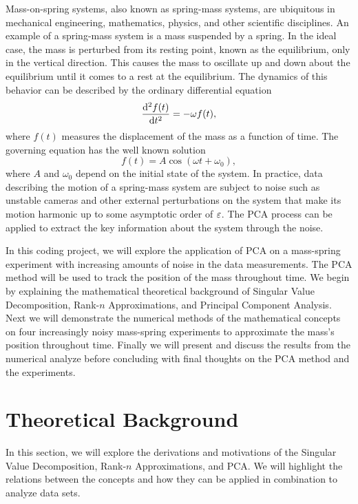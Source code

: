 \documentclass[12pt]{article}%
\begin{document}
Mass-on-spring systems, also known as spring-mass systems, are ubiquitous in mechanical engineering, mathematics, physics, and other scientific disciplines. An example of a spring-mass system is a mass suspended by a spring. In the ideal case, the mass is perturbed from its resting point, known as the equilibrium, only in the vertical direction. This causes the mass to oscillate up and down about the equilibrium until it comes to a rest at the equilibrium. The dynamics of this behavior can be described by the ordinary differential equation
\begin{equation} \label{oscillatory}
    \frac{\mathrm{d}^{2} f(t)}{\mathrm{d} t^{2}} = - \omega f(t),
\end{equation} 
where $f(t)$ measures the displacement of the mass as a function of time. The governing equation  has the well known solution
\begin{equation}
    f(t) = A \cos(\omega t + \omega_0),
\end{equation}
where $A$ and $\omega_0$ depend on the initial state of the system. In practice, data describing the motion of a spring-mass system are subject to noise such as unstable cameras and other external perturbations on the system that make its motion harmonic up to some asymptotic order of ${\varepsilon}$. The PCA process can be applied to extract the key information about the system through the noise.   



\bigskip
\bigskip

In this coding project, we will explore the application of PCA on a mass-spring experiment with increasing amounts of noise in the data measurements. The PCA method will be used to track the position of the mass throughout time. We begin by explaining the mathematical theoretical background of Singular Value Decomposition, Rank-$n$ Approximations, and Principal Component Analysis. Next we will demonstrate the numerical methods of the mathematical concepts on four increasingly noisy mass-spring experiments to approximate the mass's position throughout time. Finally we will present and discuss the results from the numerical analyze before concluding with final thoughts on the PCA method and the experiments.  



\section{Theoretical Background}

In this section, we will explore the derivations and motivations of the Singular Value Decomposition, Rank-$n$ Approximations, and PCA. We will highlight the relations between the concepts and how they can be applied in combination to analyze data sets.   
\end{document}
